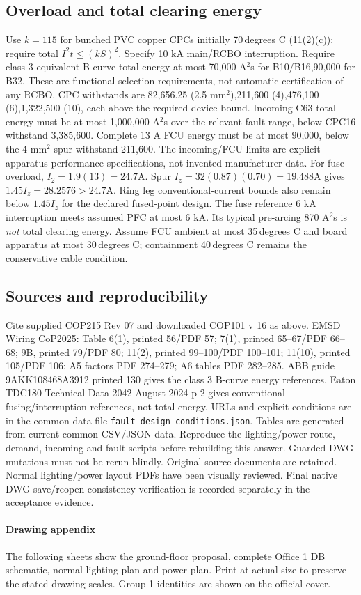 \documentclass[11pt,a4paper]{article}
\begin{document}
\subsection*{Overload and total clearing energy}
Use $k=115$ for bunched PVC copper CPCs initially 70\,degrees C (11(2)(c));  require total $I^2t\le(kS)^2$. Specify 10 kA main/RCBO interruption. Require class 3-equivalent B-curve total energy at most 70,000 A$^2$s for B10/B16,90,000 for B32. These are functional selection requirements, not automatic certification of any RCBO. CPC withstands are 82,656.25 (2.5 mm$^2$),211,600 (4),476,100 (6),1,322,500 (10), each above the required device bound.
Incoming C63 total energy must be at most 1,000,000 A$^2$s over the relevant fault range, below CPC16 withstand 3,385,600. Complete 13 A FCU energy must be at most 90,000, below the 4 mm$^2$ spur withstand 211,600. The incoming/FCU limits are explicit apparatus performance specifications, not invented manufacturer data.
For fuse overload, $I_2=1.9(13)=24.7$A. Spur $I_z=32(0.87)(0.70)=19.488$A gives $1.45I_z=28.2576>24.7$A. Ring leg conventional-current bounds also remain below $1.45I_z$ for the declared fused-point design. The fuse reference 6 kA interruption meets assumed PFC at most 6 kA. Its typical pre-arcing 870 A$^2$s is \emph{not} total clearing energy. Assume FCU ambient at most 35\,degrees C and board apparatus at most 30\,degrees C;  containment 40\,degrees C remains the conservative cable condition.
\subsection*{Sources and reproducibility}
Cite supplied COP215 Rev 07 and downloaded COP101 v 16 as above. EMSD Wiring CoP2025: Table 6(1), printed 56/PDF 57; 7(1), printed 65--67/PDF 66--68; 9B, printed 79/PDF 80; 11(2), printed 99--100/PDF 100--101; 11(10), printed 105/PDF 106;  A5 factors PDF 274--279;  A6 tables PDF 282--285.
ABB guide 9AKK108468A3912 printed 130 gives the class 3 B-curve energy references. Eaton TDC180 Technical Data 2042 August 2024 p 2 gives conventional-fusing/interruption references, not total energy. URLs and explicit conditions are in the common data file \texttt{fault\_design\_conditions.json}.
Tables are generated from current common CSV/JSON data. Reproduce the lighting/power route, demand, incoming and fault scripts before rebuilding this answer. Guarded DWG mutations must not be rerun blindly. Original source documents are retained. Normal lighting/power layout PDFs have been visually reviewed. Final native DWG save/reopen consistency verification is recorded separately in the acceptance evidence.
\paragraph*{Drawing appendix}
The following sheets show the ground-floor proposal, complete Office 1 DB schematic, normal lighting plan and power plan. Print at actual size to preserve the stated drawing scales. Group 1 identities are shown on the official cover.




\end{document}
